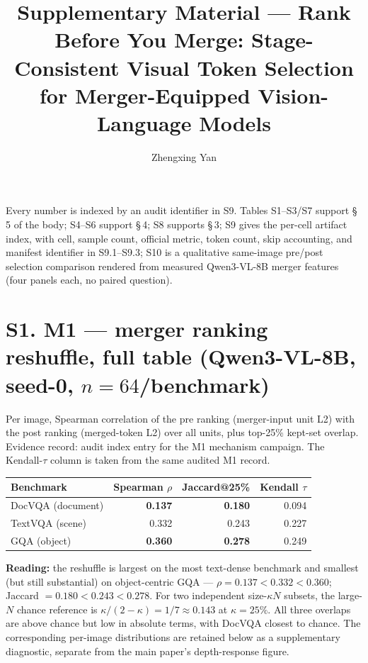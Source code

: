 \documentclass[journal]{IEEEtran}
\title{Supplementary Material --- Rank Before You Merge: Stage-Consistent
  Visual Token Selection for Merger-Equipped Vision-Language Models}
\author{Zhengxing Yan}
\begin{document}
\maketitle

\noindent\footnotesize Every number is indexed by an audit identifier in S9. Tables S1--S3/S7 support
\S\,5 of the body; S4--S6 support \S\,4; S8
supports \S\,3; S9 gives the per-cell artifact index, with cell, sample count,
official metric, token count, skip accounting, and manifest identifier in
S9.1--S9.3; S10 is a qualitative same-image pre/post selection comparison
rendered from measured Qwen3-VL-8B merger features (four panels each, no paired
question).

\section*{S1. M1 --- merger ranking reshuffle, full table (Qwen3-VL-8B, seed-0, $n = 64$/benchmark)}

Per image, Spearman correlation of the pre ranking (merger-input unit L2) with
the post ranking (merged-token L2) over all units, plus top-25\% kept-set
overlap. Evidence record: audit index entry for the M1
mechanism campaign. The Kendall-$\tau$ column is taken from the same audited
M1 record.

\begin{table}[ht]
  \centering
  \scriptsize
  \setlength{\tabcolsep}{3pt}
  \begin{tabular}{@{}l r r r@{}}
    \toprule
    Benchmark & Spearman $\rho$ & Jaccard@25\% & Kendall $\tau$ \\
    \midrule
    DocVQA (document) & \textbf{0.137} & \textbf{0.180} & 0.094 \\
    TextVQA (scene)   & 0.332          & 0.243          & 0.227 \\
    GQA (object)      & \textbf{0.360} & \textbf{0.278} & 0.249 \\
    \bottomrule
  \end{tabular}
\end{table}

\noindent\textbf{Reading:} the reshuffle is largest on the most text-dense
benchmark and smallest (but still substantial) on object-centric GQA ---
$\rho = 0.137 < 0.332 < 0.360$; Jaccard $= 0.180 < 0.243 < 0.278$. For two
independent size-$\kappa N$ subsets, the large-$N$ chance reference is
$\kappa/(2-\kappa)=1/7\approx0.143$ at $\kappa=25\%$. All three overlaps are
above chance but low in absolute terms, with DocVQA closest to chance. The
corresponding per-image distributions are retained below as a supplementary
diagnostic, separate from the main paper's depth-response figure.
\end{document}
